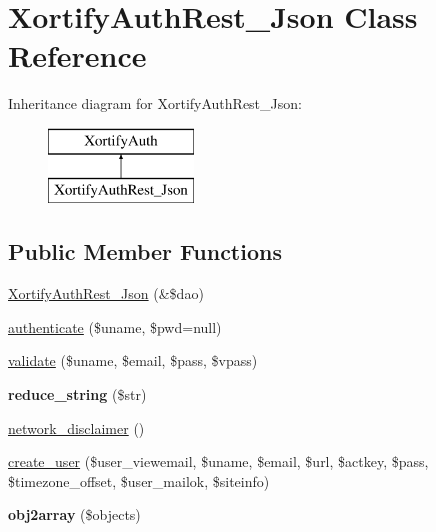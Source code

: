\hypertarget{class_xortify_auth_rest___json}{\section{Xortify\-Auth\-Rest\-\_\-\-Json Class Reference}
\label{class_xortify_auth_rest___json}
}
Inheritance diagram for Xortify\-Auth\-Rest\-\_\-\-Json\-:\begin{figure}[H]
\begin{center}
\leavevmode
\includegraphics[height=2.000000cm]{class_xortify_auth_rest___json}
\end{center}
\end{figure}
\subsection*{Public Member Functions}
\begin{DoxyCompactItemize}
\item 
\hyperlink{class_xortify_auth_rest___json_aa89b0b0b883cdf0a339fec19534489a4}{Xortify\-Auth\-Rest\-\_\-\-Json} (\&\$dao)
\item 
\hyperlink{class_xortify_auth_rest___json_ae3d91393c14bcf1334f52d66c80d6161}{authenticate} (\$uname, \$pwd=null)
\item 
\hyperlink{class_xortify_auth_rest___json_aa3de69fea6d9235f38c88e767cb1cbd5}{validate} (\$uname, \$email, \$pass, \$vpass)
\item 
\hypertarget{class_xortify_auth_rest___json_a7bd64c50e2d113e7ef86497a14bb4de4}{{\bfseries reduce\-\_\-string} (\$str)}\label{class_xortify_auth_rest___json_a7bd64c50e2d113e7ef86497a14bb4de4}

\item 
\hyperlink{class_xortify_auth_rest___json_a5b7fd33a78f61944e8bada92a440f365}{network\-\_\-disclaimer} ()
\item 
\hyperlink{class_xortify_auth_rest___json_af27fd45a04daf23c4a054878b00e194f}{create\-\_\-user} (\$user\-\_\-viewemail, \$uname, \$email, \$url, \$actkey, \$pass, \$timezone\-\_\-offset, \$user\-\_\-mailok, \$siteinfo)
\item 
\hypertarget{class_xortify_auth_rest___json_aff6a89d4849e222b7f8c1e799ce7121c}{{\bfseries obj2array} (\$objects)}\label{class_xortify_auth_rest___json_aff6a89d4849e222b7f8c1e799ce7121c}

\end{DoxyCompactItemize}
